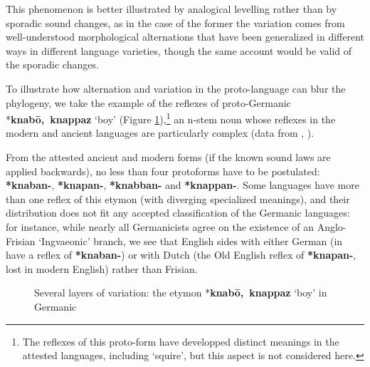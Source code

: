 \documentclass[svgnames,12pt]{scrartcl}
\newcommand{\ipa}[1]{\textbf{{\phon\mbox{#1}}}}
\begin{document}
{{This phenomenon is better illustrated by analogical levelling rather than by sporadic sound changes, as in the case of the former the variation comes from well-understood morphological alternations that have been generalized in different ways in different language varieties, though the same account  would be valid of the sporadic changes.

To illustrate how alternation and variation in the proto-language can blur the phylogeny, we take the example of the reflexes of proto-Germanic *\ipa{knabō, knappaz} `boy' (Figure \ref{fig:knabe}),\footnote{The reflexes of this proto-form have developped distinct meanings in the attested languages, including `squire', but this aspect is not considered here.} an n-stem noun whose reflexes in the modern and ancient languages are particularly complex (data from \citealt[71,128]{kroonen11nstems}, \citealt[294]{kroonen13dict}).

From the attested ancient and modern forms (if the known sound laws are applied backwards), no less than four protoforms have to be postulated:  \ipa{*knaban-}, \ipa{*knapan-}, \ipa{*knabban-} and \ipa{*knappan-}. Some languages have more than one reflex of this etymon (with diverging specialized meanings), and their distribution does not fit any accepted classification of the Germanic languages: for instance, while nearly all Germanicists agree on the existence of an Anglo-Frisian `Ingvaeonic' branch, we see that English sides with either German (in have a reflex of \ipa{*knaban-}) or with Dutch (the Old English reflex of \ipa{*knapan-}, lost in modern English) rather than Frisian.

   \begin{figure}[h]
   \caption{Several layers of variation: the etymon *\ipa{knabō, knappaz} `boy' in Germanic} \label{fig:knabe}   \centering
\end{figure}

}}
\end{document}
